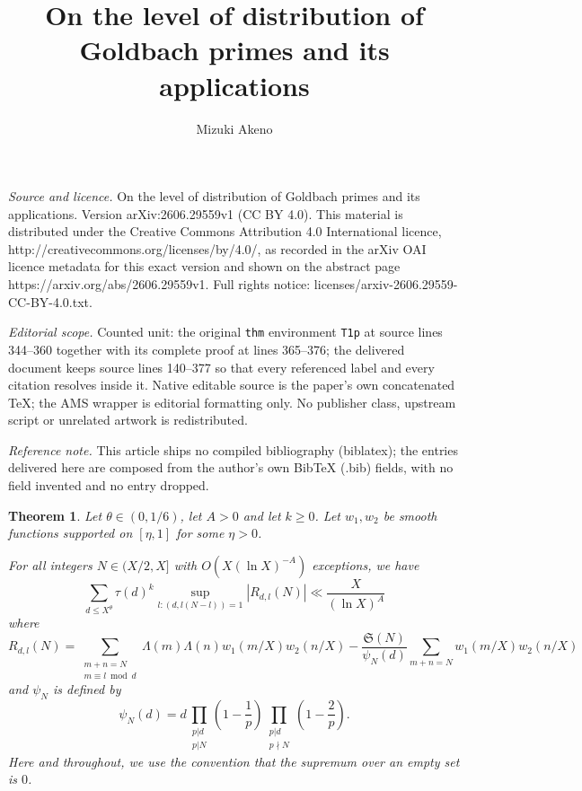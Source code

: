 \documentclass[10pt,a4paper]{amsart}
\newtheorem{thm}[dfn]{Theorem}
\newcommand{\1}{
    \bm{1}
}
\begin{document}
\title[On the level of distribution of Goldbach primes and its appl]{On the level of distribution of Goldbach primes and its applications}
\author{Mizuki Akeno}
\date{}
\maketitle
\noindent\emph{Source and licence.} On the level of distribution of Goldbach primes and its applications. Version arXiv:2606.29559v1 (CC BY 4.0). This material is distributed under the Creative Commons Attribution 4.0 International licence, http://creativecommons.org/licenses/by/4.0/, as recorded in the arXiv OAI licence metadata for this exact version and shown on the abstract page https://arxiv.org/abs/2606.29559v1. Full rights notice: licenses/arxiv-2606.29559-CC-BY-4.0.txt.\par\smallskip
\noindent\textit{Editorial scope.} Counted unit: the original \texttt{thm} environment \texttt{T1p} at source lines 344--360 together with its complete proof at lines 365--376; the delivered document keeps source lines 140--377 so that every referenced label and every citation resolves inside it. Native editable source is the paper's own concatenated TeX; the AMS wrapper is editorial formatting only. No publisher class, upstream script or unrelated artwork is redistributed.
\par\smallskip\noindent\textit{Reference note.} This article ships no compiled bibliography (biblatex); the entries delivered here are composed from the author's own BibTeX (.bib) fields, with no field invented and no entry dropped.
\begin{thm}\label{T1}
Let $\theta \in (0,1/6)$, let $A>0$ and let $k \geq 0$. 
Let $w_1,w_2$ be smooth functions supported on $[\eta,1]$ for some $\eta>0$. 

For all integers $N \in (X/2,X]$ with $O(X(\ln{X})^{-A})$ exceptions, we have
\[ \sum_{d \leq X^{\theta}} \tau(d)^k \sup_{l:(d,l(N-l))=1} |R_{d,l}(N)| \ll \frac{X}{(\ln{X})^A} \]
where
\[ R_{d,l}(N) = \sum_{\substack{m+n=N \\ m \equiv l \bmod d}} \Lambda(m) \Lambda(n) w_1(m/X) w_2(n/X) - \frac{\mathfrak{S}(N)}{\psi_N(d)} \sum_{m+n=N} w_1(m/X) w_2(n/X) \]
and $\psi_N$ is defined by
\[ \psi_N(d) = d \prod_{\substack{p|d \\ p | N}} \left( 1 - \frac{1}{p} \right) \prod_{\substack{p|d \\ p \nmid N}} \left( 1 - \frac{2}{p} \right). \]
Here and throughout, we use the convention that the supremum over an empty set is $0$. 
\end{thm}
\end{document}
